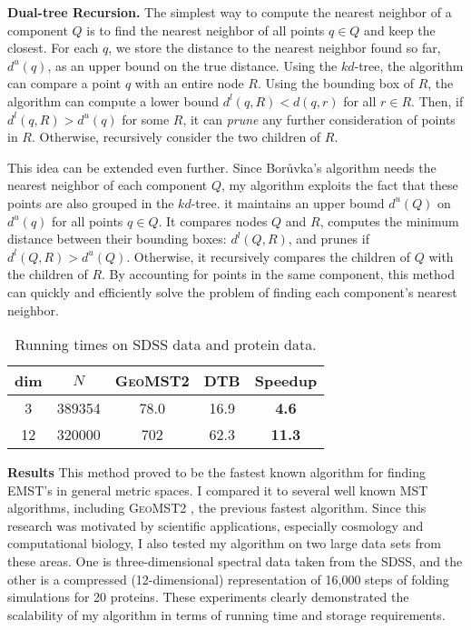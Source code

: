 \documentclass[twoside,leqno, 12pt]{article}
\begin{document}
\textbf{Dual-tree Recursion.}  The simplest way to compute the nearest neighbor of a component $Q$ is to find the nearest neighbor of all points $q \in Q$ and keep the closest.  For each $q$, we store the distance to the nearest neighbor found so far, $d^u(q)$, as an upper bound on the true distance.  Using the $kd$-tree, the algorithm can compare a point $q$ with an entire node $R$.  Using the bounding box of $R$, the algorithm can compute a lower bound $d^l(q, R) < d(q, r)$ for all $r \in R$.  Then, if $d^l(q, R) > d^u(q)$ for some $R$, it can \emph{prune} any further consideration of points in $R$.  Otherwise, recursively consider the two children of $R$.

This idea can be extended even further.  Since Bor\r{u}vka's algorithm needs the nearest neighbor of each component $Q$, my algorithm exploits the fact that these points are also grouped in the $kd$-tree.  it maintains an upper bound $d^u(Q)$ on $d^u(q)$ for all points $q \in Q$.  It compares nodes $Q$ and $R$, computes the minimum distance between their bounding boxes: $d^l(Q,R)$, and prunes if $d^l(Q, R) > d^u(Q)$.  Otherwise, it recursively compares the children of $Q$ with the children of $R$.  By accounting for points in the same component, this method can quickly and efficiently solve the problem of finding each component's nearest neighbor.  
\begin{wraptable}{r}{0.55\textwidth}
\begin{tabular}{|c|c|c|c|c|} \hline
dim & $N$ & \textsc{GeoMST2} & \textsc{DTB} & Speedup \\ \hline \hline
3 & 389354 & 78.0 & 16.9 & \textbf{4.6} \\ \hline 
12 & 320000 & 702 & 62.3 & \textbf{11.3} \\ \hline 
\end{tabular}
\caption{Running times on SDSS data and protein data.}
\end{wraptable}


\textbf{Results}
This method proved to be the fastest known algorithm for finding EMST's in general metric spaces.  I compared it to several well known MST algorithms, including \textsc{GeoMST2} \cite{narzhuzac:00}, the previous fastest algorithm.  Since this research was motivated by scientific applications, especially cosmology and computational biology, I also tested my algorithm on two large data sets from these areas.  One is three-dimensional spectral data taken from the SDSS, and the other is a compressed (12-dimensional) representation of 16,000 steps of folding simulations for 20 proteins.  These experiments clearly demonstrated the scalability of my algorithm in terms of running time and storage requirements.
\end{document}

